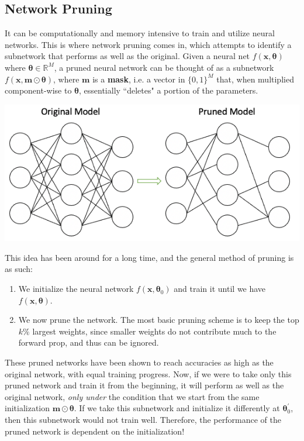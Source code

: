   \subsection{Network Pruning}

    It can be computationally and memory intensive to train and utilize neural networks. This is where network pruning comes in, which attempts to identify a subnetwork that performs as well as the original. Given a neural net $f(\mathbf{x}, \boldsymbol{\theta})$ where $\boldsymbol{\theta} \in \mathbb{R}^M$, a pruned neural network can be thought of as a subnetwork $f(\mathbf{x}, \mathbf{m} \odot \boldsymbol{\theta})$, where $\mathbf{m}$ is a \textbf{mask}, i.e. a vector in $\{0, 1\}^M$ that, when multiplied component-wise to $\boldsymbol{\theta}$, essentially ``deletes" a portion of the parameters. 
    \begin{center}
        \includegraphics[scale=0.4]{img/02_Control/pruned_network.png}
    \end{center}
    This idea has been around for a long time, and the general method of pruning is as such: 
    \begin{enumerate}
        \item We initialize the neural network $f(\mathbf{x}, \boldsymbol{\theta}_0)$ and train it until we have $f(\mathbf{x}, \boldsymbol{\theta})$. 
        \item We now prune the network. The most basic pruning scheme is to keep the top $k\%$ largest weights, since smaller weights do not contribute much to the forward prop, and thus can be ignored. 
    \end{enumerate}
    These pruned networks have been shown to reach accuracies as high as the original network, with equal training progress. Now, if we were to take only this pruned network and train it from the beginning, it will perform as well as the original network, \textit{only under} the condition that we start from the same initialization $\mathbf{m} \odot \boldsymbol{\theta}$. If we take this subnetwork and initialize it differently at $\boldsymbol{\theta}_0^\prime$, then this subnetwork would not train well. Therefore, the performance of the pruned network is dependent on the initialization! 


